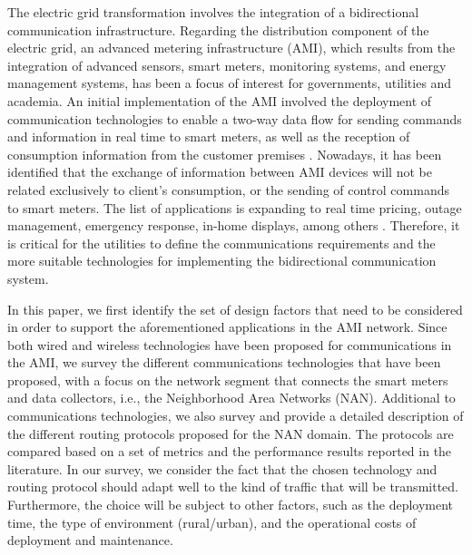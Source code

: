 \documentclass[11pt,draftclsnofoot,onecolumn]{IEEEtran}
\begin{document}
 The electric grid transformation involves the integration of a bidirectional communication infrastructure. Regarding the distribution component of the electric grid, an advanced metering infrastructure (AMI), which results from the integration of advanced sensors, smart meters, monitoring systems, and energy management systems, has been a focus of interest for governments, utilities and academia. An initial implementation of the AMI involved the deployment of communication technologies to enable a two-way data flow for sending commands and information in real time to smart meters, as well as the reception of consumption information from the customer premises \cite{Deconinck2008}. Nowadays, it has been identified that the exchange of information between AMI devices will not be related exclusively to client's consumption, or the sending of control commands to smart meters. The list of applications is expanding to real time pricing, outage management, emergency response, in-home displays, among others \cite{Rajalingham2013}. Therefore, it is critical for the utilities to define the communications requirements and the more suitable technologies for implementing the bidirectional communication system. 
 
In this paper, we first identify the set of design factors that need to be considered in order to support the aforementioned applications in the AMI network. Since both wired and wireless technologies have been proposed for communications in the AMI, we survey the different communications technologies that have been proposed, with a focus on the network segment that connects the smart meters and data collectors, i.e., the Neighborhood Area Networks (NAN). Additional to communications technologies, we also survey and provide a  detailed description of the different routing protocols proposed for the NAN domain. The protocols are compared based on a set of metrics and the performance results reported in the literature. In our survey, we consider the fact that the chosen technology and routing protocol should adapt well to the kind of traffic that will be transmitted. Furthermore, the choice will be subject to other factors, such as the deployment time, the type of environment (rural/urban), and the operational costs of deployment and maintenance.
\end{document}
